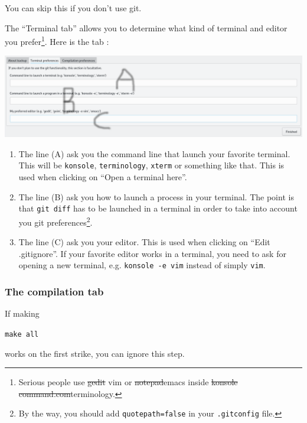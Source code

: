 \documentclass[a4paper,12pt]{article}
\newcommand{\info}[1]{\texttt{#1}}
\begin{document}
You can skip this if you don't use git. 

The ``Terminal tab'' allows you to determine what kind of terminal and editor you prefer\footnote{Serious people use \sout{gedit} vim or \sout{notepad}emacs inside \sout{konsole}\,\sout{command.com}terminology.}.
Here is the tab :

\begin{center}
    \includegraphics[width=\linewidth]{terminal_tab.png}
\end{center}
\begin{enumerate}
    \item
        The line (A) ask you the command line that launch your favorite terminal. This will be \info{konsole}, \info{terminology}, \info{xterm} or something like that. This is used when clicking on ``Open a terminal here''.
    \item
        The line (B) ask you how to launch a process in your terminal. The point is that \info{git diff} has to be launched in a terminal in order to take into account you git preferences\footnote{By the way, you should add \info{quotepath=false} in your \info{.gitconfig} file.}.
    \item
        The line (C) ask you your editor. This is used when clicking on ``Edit .gitignore''. If your favorite editor works in a terminal, you need to ask for opening a new terminal, e.g. \info{konsole -e vim} instead of simply \info{vim}.
\end{enumerate}

\subsubsection{The compilation tab}

If making
\begin{center}
    \info{make all}
\end{center}
works on the first strike, you can ignore this step.
\end{document}
